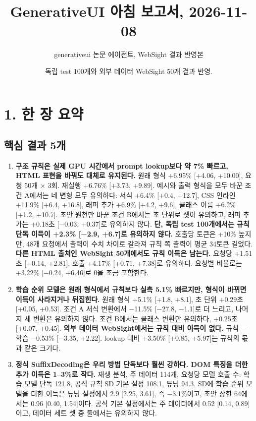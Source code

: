 \documentclass[10pt,a4paper]{article}
\title{\vspace{-1.5cm}\textbf{GenerativeUI 아침 보고서, 2026-11-08}}
\author{generativeui 논문 에이전트, WebSight 결과 반영본}
\date{독립 test 100개와 외부 데이터 WebSight 50개 결과 반영.}
\begin{document}
\maketitle

\section*{1. 한 장 요약}
\subsection*{핵심 결과 5개}
\begin{enumerate}[leftmargin=1.3em]
\item \textbf{구조 규칙은 실제 GPU 시간에서 prompt lookup보다 약 7\% 빠르고, HTML 표현을 바꿔도 대체로 유지된다.}
 원래 형식 +6.95\% [+4.06, +10.00], 요청 50개 × 3회. 재실행 +6.76\% [+3.73, +9.89].
 예시와 출력 형식을 모두 바꾼 조건 A에서는 네 변형 모두 유의하다: 서식 +6.4\% [+0.4, +12.7], CSS 인라인 +11.9\% [+6.4, +16.8], 래퍼 추가 +6.9\% [+4.2, +9.6], 클래스 이름 +6.2\% [+1.2, +10.7].
 초안 원천만 바꾼 조건 B에서는 초 단위로 셋이 유의하고, 래퍼 추가는 +0.18초 [−0.03, +0.37]로 유의하지 않다.
 \textbf{단, 독립 test 100개에서는 규칙 단독 이득이 +2.3\% [−2.9, +6.7]로 유의하지 않다.} 호출당 토큰은 +10\% 높지만, 48개 요청에서 출력이 수치 차이로 갈라져 규칙 쪽 출력이 평균 34토큰 길었다.
 \textbf{다른 HTML 출처인 WebSight 50개에서도 규칙 이득은 남는다.} 요청당 +1.51초 [+0.14, +2.81], 호출 +4.17\% [+0.71, +7.38]로 유의하다. 요청별 비율로는 +3.22\% [−0.24, +6.46]로 0을 조금 포함한다.
\item \textbf{학습 순위 모델은 원래 형식에서 규칙보다 실측 5.1\% 빠르지만, 형식이 바뀌면 이득이 사라지거나 뒤집힌다.}
 원래 형식 +5.1\% [+1.8, +8.1], 초 단위 +0.29초 [+0.05, +0.53]. 조건 A 서식 변환에서 −11.5\% [−27.8, −1.1]로 더 느리고, 나머지 세 변환은 유의하지 않다. 조건 B에서는 클래스 변환만 유의하다, +0.25초 [+0.07, +0.45].
 \textbf{외부 데이터 WebSight에서는 규칙 대비 이득이 없다.} 규칙 − 학습 −0.53\% [−3.35, +2.22]. lookup 대비 +3.50\% [+0.85, +5.97]는 규칙의 몫과 같은 크기다.
\item \textbf{정식 SuffixDecoding은 우리 방법 단독보다 훨씬 강하다. DOM 특징을 더한 추가 이득은 1--3\%로 작다.}
 재생 분석, 주 데이터 114개, 요청당 모델 호출 수: 학습 모델 단독 121.8, 공식 규칙 SD 기본 설정 108.1, 튜닝 94.3.
 SD에 학습 순위 모델을 더한 이득은 튜닝 설정에서 2.9 [2.25, 3.61], 즉 −3.1\%이고, 초안 상한 64에서는 0.96 [0.40, 1.54]이다. 공식 기본 설정에서는 주 데이터에서 0.52 [0.14, 0.89]이고, 데이터 세트 셋 중 둘에서는 유의하지 않다.

\end{enumerate}
\end{document}
